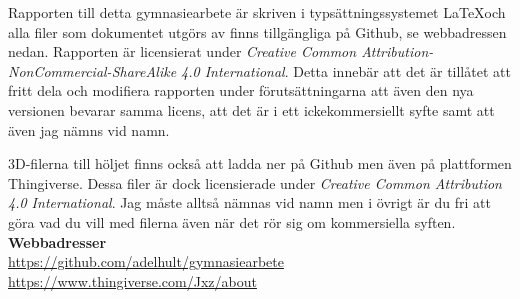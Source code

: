 Rapporten till detta gymnasiearbete är skriven i typsättningssystemet \LaTeX   och alla filer som dokumentet utgörs av finns tillgängliga på Github, se webbadressen nedan.  Rapporten är licensierat under \textit{Creative Common Attribution-NonCommercial-ShareAlike 4.0 International}. Detta innebär att det är tillåtet att fritt dela och modifiera rapporten under förutsättningarna att även den nya versionen bevarar samma licens, att det är i ett ickekommersiellt syfte samt att även jag nämns vid namn.

3D-filerna till höljet finns också att ladda ner på Github men även på plattformen Thingiverse. Dessa filer är dock licensierade under\textit{ Creative Common Attribution 4.0 International}. Jag måste alltså nämnas vid namn men i övrigt är du fri att göra vad du vill med filerna även när det rör sig om  kommersiella syften. \\

\noindent\textbf{Webbadresser}\\
\url{https://github.com/adelhult/gymnasiearbete}\\
\url{https://www.thingiverse.com/Jxz/about}
